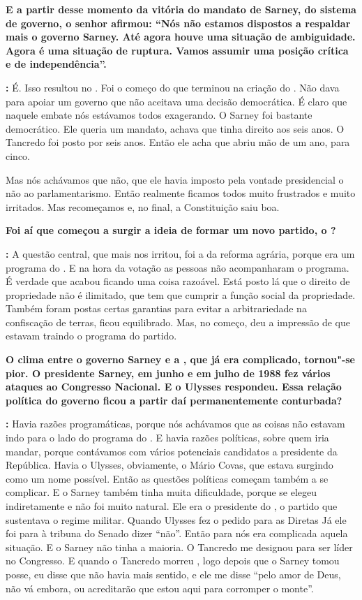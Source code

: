 \textbf{E a partir desse momento da vitória do mandato de Sarney, do
sistema de governo, o senhor afirmou: ``Nós não estamos dispostos a
respaldar mais o governo Sarney. Até agora houve uma situação de
ambiguidade. Agora é uma situação de ruptura. Vamos assumir uma posição
crítica e de independência''.}

\textbf{:} É. Isso resultou no . Foi o começo do que terminou na
criação do . Não dava para apoiar um governo que não aceitava uma
decisão democrática. É claro que naquele embate nós estávamos todos
exagerando. O Sarney foi bastante democrático. Ele queria um mandato,
achava que tinha direito aos seis anos. O Tancredo foi posto por seis
anos. Então ele acha que abriu mão de um ano, para cinco.

Mas nós achávamos que não, que ele havia imposto pela vontade
presidencial o não ao parlamentarismo. Então realmente ficamos todos
muito frustrados e muito irritados. Mas recomeçamos e, no final, a
Constituição saiu boa.

\textbf{Foi aí que começou a surgir a ideia de formar um novo partido, o
?}

\textbf{:} A questão central, que mais nos irritou, foi a da reforma
agrária, porque era um programa do . E na hora da votação as pessoas
não acompanharam o programa. É verdade que acabou ficando uma coisa
razoável. Está posto lá que o direito de propriedade não é ilimitado,
que tem que cumprir a função social da propriedade. Também foram postas
certas garantias para evitar a arbitrariedade na confiscação de terras,
ficou equilibrado. Mas, no começo, deu a impressão de que estavam
traindo o programa do partido.

\textbf{O clima entre o governo Sarney e a , que já era complicado,
tornou"-se pior. O presidente Sarney, em junho e em julho de 1988 fez
vários ataques ao Congresso Nacional. E o Ulysses respondeu. Essa
relação política do governo ficou a partir daí permanentemente
conturbada?}

\textbf{:} Havia razões programáticas, porque nós achávamos que as
coisas não estavam indo para o lado do programa do . E havia razões
políticas, sobre quem iria mandar, porque contávamos com vários
potenciais candidatos a presidente da República. Havia o Ulysses,
obviamente, o Mário Covas, que estava surgindo como um nome possível.
Então as questões políticas começam também a se complicar. E o Sarney
também tinha muita dificuldade, porque se elegeu indiretamente e não foi
muito natural. Ele era o presidente do , o partido que sustentava o
regime militar. Quando Ulysses fez o pedido para as Diretas Já ele foi
para à tribuna do Senado dizer ``não''. Então para nós era complicada
aquela situação. E o Sarney não tinha a maioria. O Tancredo me designou
para ser líder no Congresso. E quando o Tancredo morreu , logo depois
que o Sarney tomou posse, eu disse que não havia mais sentido, e ele me
disse ``pelo amor de Deus, não vá embora, ou acreditarão que estou aqui
para corromper o monte''.


